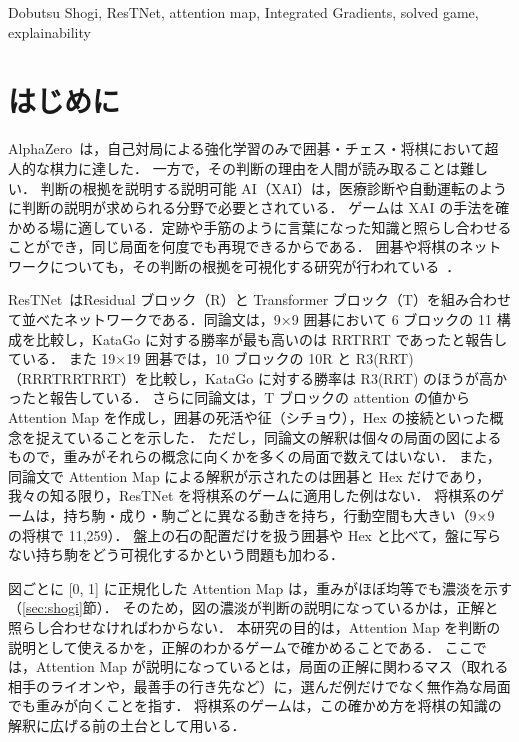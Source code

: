 \documentclass[submit]{ipsj}
\begin{document}
\begin{ekeyword}
Dobutsu Shogi, ResTNet, attention map, Integrated Gradients, solved game, explainability
\end{ekeyword}

\maketitle
\thispagestyle{empty}

\section{はじめに}
AlphaZero~\cite{alphazero}は，自己対局による強化学習のみで囲碁・チェス・将棋において超人的な棋力に達した．
一方で，その判断の理由を人間が読み取ることは難しい．
判断の根拠を説明する説明可能 AI（XAI）は，医療診断や自動運転のように判断の説明が求められる分野で必要とされている．
ゲームは XAI の手法を確かめる場に適している．定跡や手筋のように言葉になった知識と照らし合わせることができ，同じ局面を何度でも再現できるからである．
囲碁や将棋のネットワークについても，その判断の根拠を可視化する研究が行われている~\cite{mandai2018,ota2024}．

ResTNet~\cite{restnet}はResidual ブロック（R）と Transformer ブロック（T）を組み合わせて並べたネットワークである．同論文は，9×9 囲碁において 6 ブロックの 11 構成を比較し，KataGo に対する勝率が最も高いのは RRTRRT であったと報告している．
また 19×19 囲碁では，10 ブロックの 10R と R3(RRT)（RRRTRRTRRT）を比較し，KataGo に対する勝率は R3(RRT) のほうが高かったと報告している．
さらに同論文は，T ブロックの attention の値から Attention Map を作成し，囲碁の死活や征（シチョウ），Hex の接続といった概念を捉えていることを示した．
ただし，同論文の解釈は個々の局面の図によるもので，重みがそれらの概念に向くかを多くの局面で数えてはいない．
また，同論文で Attention Map による解釈が示されたのは囲碁と Hex だけであり，我々の知る限り，ResTNet を将棋系のゲームに適用した例はない．
将棋系のゲームは，持ち駒・成り・駒ごとに異なる動きを持ち，行動空間も大きい（9×9 の将棋で 11,259）．
盤上の石の配置だけを扱う囲碁や Hex と比べて，盤に写らない持ち駒をどう可視化するかという問題も加わる．

図ごとに [0, 1] に正規化した Attention Map は，重みがほぼ均等でも濃淡を示す（\ref{sec:shogi}節）．
そのため，図の濃淡が判断の説明になっているかは，正解と照らし合わせなければわからない．
本研究の目的は，Attention Map を判断の説明として使えるかを，正解のわかるゲームで確かめることである．
ここでは，Attention Map が説明になっているとは，局面の正解に関わるマス（取れる相手のライオンや，最善手の行き先など）に，選んだ例だけでなく無作為な局面でも重みが向くことを指す．
将棋系のゲームは，この確かめ方を将棋の知識の解釈に広げる前の土台として用いる．
\end{document}
